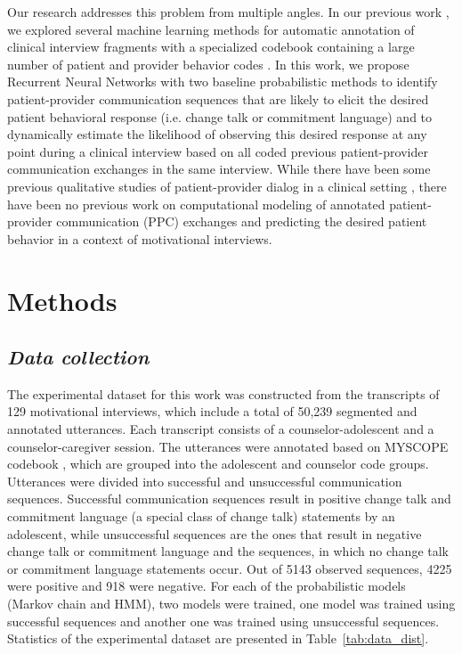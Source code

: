 \documentclass{amia_summit_2018}
\begin{document}
Our research addresses this problem from multiple angles. In our previous work \cite{kotov2015interpretable, hasan2016study}, we explored several machine learning methods for automatic annotation of clinical interview fragments with a specialized codebook containing a large number of patient and provider behavior codes \cite{carcone2013provider}. In this work, we propose Recurrent Neural Networks with two baseline probabilistic methods to identify patient-provider communication sequences that are likely to elicit the desired patient behavioral response (i.e. change talk or commitment language) and to dynamically estimate the likelihood of observing this desired response at any point during a clinical interview based on all coded previous patient-provider communication exchanges in the same interview. While there have been some previous qualitative studies of patient-provider dialog in a clinical setting \cite{eide2004physician}, there have been no previous work on computational modeling of annotated patient-provider communication (PPC) exchanges and predicting the desired patient behavior in a context of motivational interviews.   

\section*{Methods}
\subsection*{\textit{Data collection}}
The experimental dataset for this work was constructed from the transcripts of 129 motivational interviews, which include a total of 50,239 segmented and annotated utterances. Each transcript consists of a counselor-adolescent and a counselor-caregiver session. The utterances were annotated based on MYSCOPE codebook \cite{carcone2013provider}, which are grouped into the adolescent and counselor code groups. Utterances were divided into successful and unsuccessful communication sequences. Successful communication sequences result in positive change talk and commitment language (a special class of change talk) statements by an adolescent, while unsuccessful sequences are the ones that result in negative change talk or commitment language and the sequences, in which no change talk or commitment language statements occur. Out of 5143 observed sequences, 4225 were positive and 918 were negative. For each of the probabilistic models (Markov chain and HMM), two models were trained, one model was trained using successful sequences and another one was trained using unsuccessful sequences. Statistics of the experimental dataset are presented in Table~\ref{tab:data_dist}. \\
\end{document}
